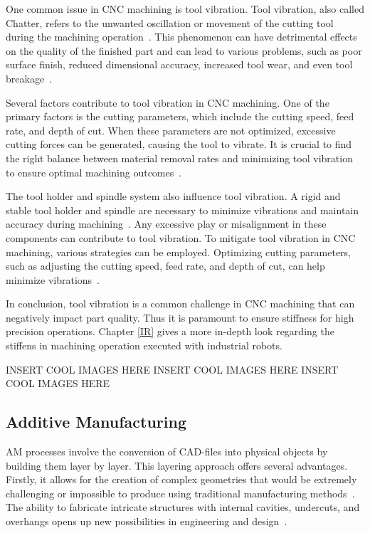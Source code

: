 One common issue in CNC machining is tool vibration. Tool vibration, also called Chatter, refers to the unwanted oscillation or movement of the cutting tool during the machining operation~\cite{YUE.2019}. This phenomenon can have detrimental effects on the quality of the finished part and can lead to various problems, such as poor surface finish, reduced dimensional accuracy, increased tool wear, and even tool breakage~\cite{Aslan.2018}.

Several factors contribute to tool vibration in CNC machining. One of the primary factors is the cutting parameters, which include the cutting speed, feed rate, and depth of cut. When these parameters are not optimized, excessive cutting forces can be generated, causing the tool to vibrate. It is crucial to find the right balance between material removal rates and minimizing tool vibration to ensure optimal machining outcomes~\cite{GiorgioBort.2016}.

The tool holder and spindle system also influence tool vibration. A rigid and stable tool holder and spindle are necessary to minimize vibrations and maintain accuracy during machining~\cite{Wan.2019}. Any excessive play or misalignment in these components can contribute to tool vibration. To mitigate tool vibration in CNC machining, various strategies can be employed. Optimizing cutting parameters, such as adjusting the cutting speed, feed rate, and depth of cut, can help minimize vibrations~\cite{Ong.2019}.

In conclusion, tool vibration is a common challenge in CNC machining that can negatively impact part quality. Thus it is paramount to ensure stiffness for high precision operations.
Chapter \ref{IR} gives a more in-depth look regarding the stiffens in machining operation executed with industrial robots.

INSERT COOL IMAGES HERE\newline
INSERT COOL IMAGES HERE\newline
INSERT COOL IMAGES HERE\newline

\subsection{Additive Manufacturing}
AM processes involve the conversion of CAD-files into physical objects by building them layer by layer. This layering approach offers several advantages. Firstly, it allows for the creation of complex geometries that would be extremely challenging or impossible to produce using traditional manufacturing methods~\cite{Prakash.2018}. The ability to fabricate intricate structures with internal cavities, undercuts, and overhangs opens up new possibilities in engineering and design~\cite{Abdulhameed.2019}.

